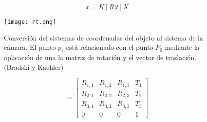 \begin{equation}
  x = K [R|t] X  
\end{equation}

\begin{figure}[h!]
  \centering
  \texttt{[image: rt.png]}
  \caption{Conversión del sistemas de coordenadas del objeto al sistema de la cámara. El punto $p_c$
    está relacionado con el punto $P_0$ mediante la aplicación de una la matriz de rotación y el
    vector de traslación. (Bradski y Kaehler)}
  \label{fig:RT}
\end{figure}

\begin{equation}
  [R|t] = 
  \begin{bmatrix} 
    R_{1,1} & R_{1,2} & R_{1,3} & T_{1}  \\
    R_{2,1} & R_{2,2} & R_{2,3} & T_{2}  \\
    R_{3,1} & R_{3,2} & R_{3,3} & T_{3}  \\
    0      &   0    &   0   &  1
  \end{bmatrix}
\end{equation}

